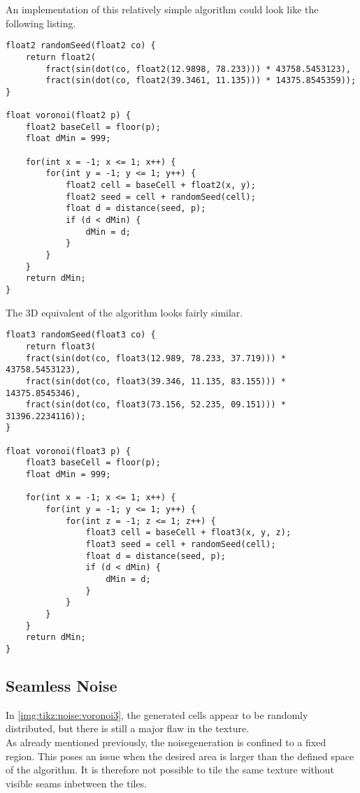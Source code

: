 \noindent
An implementation of this relatively simple algorithm could look like the following listing.
\begin{lstlisting}[language=HLSL, caption=Implementation of 2D Voronoi \gls{noise} algorithm., label=lst:shader:noise:voronoi2d]
float2 randomSeed(float2 co) {
    return float2(
        fract(sin(dot(co, float2(12.9898, 78.233))) * 43758.5453123),
        fract(sin(dot(co, float2(39.3461, 11.135))) * 14375.8545359));
}

float voronoi(float2 p) {
    float2 baseCell = floor(p);
    float dMin = 999;

    for(int x = -1; x <= 1; x++) {
        for(int y = -1; y <= 1; y++) {
            float2 cell = baseCell + float2(x, y);
            float2 seed = cell + randomSeed(cell);
            float d = distance(seed, p);
            if (d < dMin) {
                dMin = d;
            }
        }
    }
    return dMin;
}
\end{lstlisting}

\noindent
The 3D equivalent of the algorithm looks fairly similar.

\begin{lstlisting}[language=HLSL, caption=Implementation of 3D Voronoi \gls{noise} algorithm., label=lst:shader:noise:voronoi3d]
float3 randomSeed(float3 co) {
    return float3(
    fract(sin(dot(co, float3(12.989, 78.233, 37.719))) * 43758.5453123),
    fract(sin(dot(co, float3(39.346, 11.135, 83.155))) * 14375.8545346),
    fract(sin(dot(co, float3(73.156, 52.235, 09.151))) * 31396.2234116));
}

float voronoi(float3 p) {
    float3 baseCell = floor(p);
    float dMin = 999;

    for(int x = -1; x <= 1; x++) {
        for(int y = -1; y <= 1; y++) {
            for(int z = -1; z <= 1; z++) {
                float3 cell = baseCell + float3(x, y, z);
                float3 seed = cell + randomSeed(cell);
                float d = distance(seed, p);
                if (d < dMin) {
                    dMin = d;
                }
            }
        }
    }
    return dMin;
}
\end{lstlisting}

\subsection{Seamless Noise}
\label{section:noise:seamless}
In \autoref{img:tikz:noise:voronoi3}, the generated cells appear to be randomly distributed, but there is still a major flaw in the texture.
\\
As already mentioned previously, the \gls{noisegeneration} is confined to a fixed region.
This poses an issue when the desired area is larger than the defined space of the algorithm.
It is therefore not possible to tile the same texture without visible seams inbetween the tiles.

